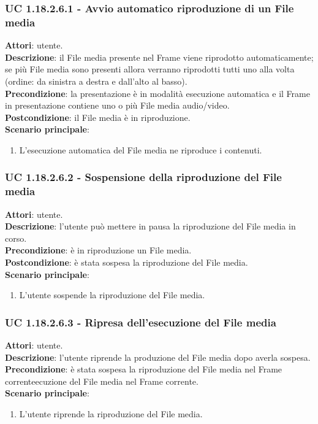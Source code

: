 	\subsubsection{UC 1.18.2.6.1 - Avvio automatico riproduzione di un File media}{
		\label{uc1.18.2.6.1}
		\textbf{Attori}: utente. \\
		\textbf{Descrizione}: il File media presente nel Frame viene riprodotto automaticamente; se più File media sono presenti allora verranno riprodotti tutti uno alla volta (ordine: da sinistra a destra e dall'alto al basso). \\
		\textbf{Precondizione}: la presentazione è in modalità esecuzione automatica e il Frame in presentazione contiene uno o più File media audio/video.	\\
		\textbf{Postcondizione}: il File media è in riproduzione.\\
		\textbf{Scenario principale}:
		\begin{enumerate}
			\item L'esecuzione automatica del File media ne riproduce i contenuti.
		\end{enumerate}				
	}
	\subsubsection{UC 1.18.2.6.2 - Sospensione della riproduzione del File media}{
		\label{uc1.18.2.6.2}
		\textbf{Attori}: utente. \\
		\textbf{Descrizione}: l'utente può mettere in pausa la riproduzione del File media in corso. \\
		\textbf{Precondizione}: è in riproduzione un File media.	\\
		\textbf{Postcondizione}: è stata sospesa la riproduzione del File media.\\
		\textbf{Scenario principale}:
		\begin{enumerate}
			\item L'utente sospende la riproduzione del File media.
		\end{enumerate}				
	}
	\subsubsection{UC 1.18.2.6.3 - Ripresa dell'esecuzione del File media}{
		\label{uc1.18.2.6.3}
		\textbf{Attori}: utente. \\
		\textbf{Descrizione}: l'utente riprende la produzione del File media dopo averla sospesa. \\
		\textbf{Precondizione}: è stata sospesa la riproduzione del File media nel Frame correnteecuzione del File media nel Frame corrente.\\
		\textbf{Scenario principale}:
		\begin{enumerate}
			\item L'utente riprende la riproduzione del File media.
		\end{enumerate}				
	}
